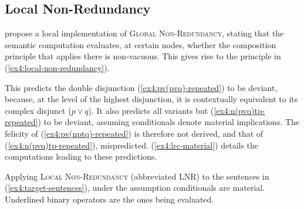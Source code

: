 \subsection{Local Non-Redundancy}
\textcite{Katzir2014} propose a local implementation of \textsc{Global Non-Redundancy}, stating that the semantic computation evaluates, at
certain nodes, whether the composition principle that applies there is non-vacuous. This gives rise to the principle in (\ref{ex4:local-non-redundancy}).

\begin{exe}
	\label{ex4:local-non-redundancy}
\end{exe}

This predicts the double disjunction (\ref{ex4:pv(pvq)-repeated}) to be deviant, because, at the level of the highest disjunction, it is contextually equivalent to its complex disjunct ($p\vee q$). It also predicts all variants but (\ref{ex4:n(pvq)tp-repeated}) to be deviant, assuming conditionals denote material implications. The felicity of (\ref{ex4:pv(nptq)-repeated}) is therefore not derived, and that of (\ref{ex4:n(pvq)tp-repeated}), mispredicted. (\ref{ex4:lrc-material}) details the computations leading to these predictions.

\begin{exe}
	\ex Applying \textsc{Local Non-Redundancy} (abbreviated LNR) to the sentences in (\ref{ex4:target-sentences}), under the assumption conditionals are material. Underlined binary operators are the ones being evaluated. \label{ex4:lrc-material}
	\begin{xlist}
		\label{ex4:pv(pvq)-lnr-material}
		\label{ex4:npt(pvq)-lnr-material}
		\label{ex4:pv(nptq)-lnr-material}
		\label{ex4:pv(nqtp)-lnr-material}
		\label{ex4:n(pvq)tp-lnr-material}
	\end{xlist}
\end{exe}

